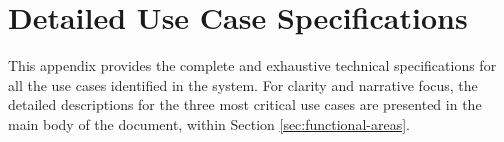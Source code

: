 \section{Detailed Use Case Specifications}
\label{appendix:use_case_specifications}

This appendix provides the complete and exhaustive technical specifications for all the use cases identified in the system. For clarity and narrative focus, the detailed descriptions for the three most critical use cases are presented in the main body of the document, within Section \ref{sec:functional-areas}.







